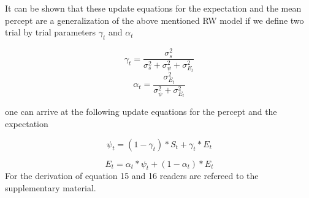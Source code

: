 \documentclass[
]{article}
\begin{document}
It can be shown that these update equations for the expectation and the
mean percept are a generalization of the above mentioned RW model if we
define two trial by trial parameters \(\gamma_{t}\) and \(\alpha_{t}\)

\[
\begin{equation}
\tag{13}
\gamma_{t} = \frac{\sigma_{s}^2}{\sigma_{s}^2+\sigma_{\psi}^2+\sigma_{E_t}^2}
\end{equation}
\] \[
\begin{equation}
\tag{14}
\alpha_{t} = \frac{\sigma_{E_t}^2}{\sigma_{\psi}^2+\sigma_{E_t}^2}
\end{equation}
\]

one can arrive at the following update equations for the percept and the
expectation

\[
\begin{equation}
\tag{15}
\psi_{t} = (1-\gamma_{t})*S_{t}+\gamma_{t}*E_{t}
\end{equation}
\]

\[
\begin{equation}
\tag{16}
E_{t} = \alpha_{t}*\psi_{t}+(1-\alpha_{t})*E_{t}
\end{equation}
\] For the derivation of equation 15 and 16 readers are refereed to the
supplementary material.
\end{document}
